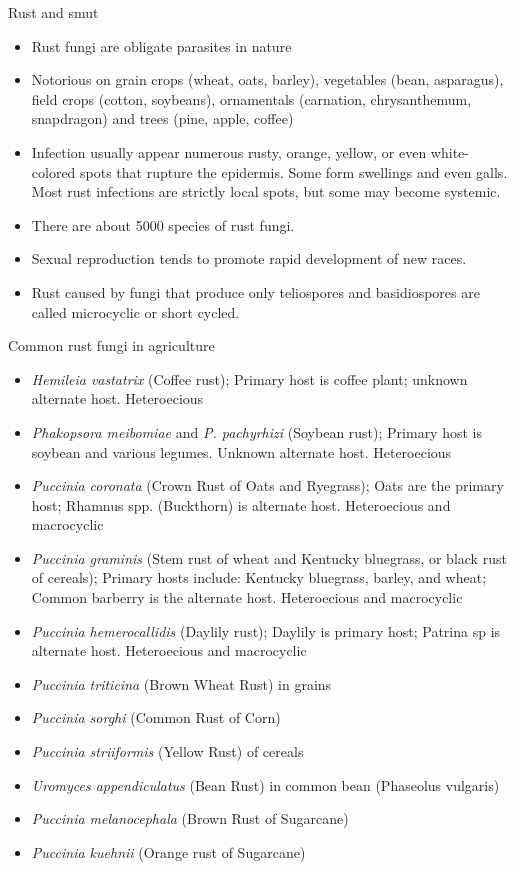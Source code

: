 \documentclass[10pt,dvipsnames,ignorenonframetext,aspectratio=169]{beamer}
\providecommand{\tightlist}{%
  \setlength{\itemsep}{0pt}\setlength{\parskip}{0pt}}
\begin{document}
\begin{frame}{Rust and smut}
\protect\hypertarget{rust-and-smut}{}
\begin{itemize}
\tightlist
\item
  Rust fungi are obligate parasites in nature
\item
  Notorious on grain crops (wheat, oats, barley), vegetables (bean,
  asparagus), field crops (cotton, soybeans), ornamentals (carnation,
  chrysanthemum, snapdragon) and trees (pine, apple, coffee)
\item
  Infection usually appear numerous rusty, orange, yellow, or even
  white-colored spots that rupture the epidermis. Some form swellings
  and even galls. Most rust infections are strictly local spots, but
  some may become systemic.
\item
  There are about 5000 species of rust fungi.
\item
  Sexual reproduction tends to promote rapid development of new races.
\item
  Rust caused by fungi that produce only teliospores and basidiospores
  are called microcyclic or short cycled.
\end{itemize}
\end{frame}

\begin{frame}{Common rust fungi in agriculture}
\protect\hypertarget{common-rust-fungi-in-agriculture}{}
\begin{itemize}
\tightlist
\item
  \emph{Hemileia vastatrix} (Coffee rust); Primary host is coffee plant;
  unknown alternate host. Heteroecious
\item
  \emph{Phakopsora meibomiae} and \emph{P. pachyrhizi} (Soybean rust);
  Primary host is soybean and various legumes. Unknown alternate host.
  Heteroecious
\item
  \emph{Puccinia coronata} (Crown Rust of Oats and Ryegrass); Oats are
  the primary host; Rhamnus spp. (Buckthorn) is alternate host.
  Heteroecious and macrocyclic
\item
  \emph{Puccinia graminis} (Stem rust of wheat and Kentucky bluegrass,
  or black rust of cereals); Primary hosts include: Kentucky bluegrass,
  barley, and wheat; Common barberry is the alternate host. Heteroecious
  and macrocyclic
\item
  \emph{Puccinia hemerocallidis} (Daylily rust); Daylily is primary
  host; Patrina sp is alternate host. Heteroecious and macrocyclic
\item
  \emph{Puccinia triticina} (Brown Wheat Rust) in grains
\item
  \emph{Puccinia sorghi} (Common Rust of Corn)
\item
  \emph{Puccinia striiformis} (Yellow Rust) of cereals
\item
  \emph{Uromyces appendiculatus} (Bean Rust) in common bean (Phaseolus
  vulgaris)
\item
  \emph{Puccinia melanocephala} (Brown Rust of Sugarcane)
\item
  \emph{Puccinia kuehnii} (Orange rust of Sugarcane)
\end{itemize}
\end{frame}
\end{document}
